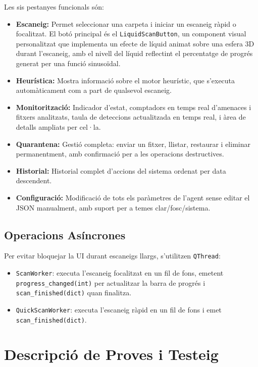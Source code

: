\documentclass[12pt,a4paper]{report}
\begin{document}
Les sis pestanyes funcionals són:
\begin{itemize}
    \item \textbf{Escaneig:} Permet seleccionar una carpeta i iniciar un escaneig ràpid o focalitzat. El botó principal és el \texttt{LiquidScanButton}, un component visual personalitzat que implementa un efecte de líquid animat sobre una esfera 3D durant l'escaneig, amb el nivell del líquid reflectint el percentatge de progrés generat per una funció sinusoïdal.
    \item \textbf{Heurística:} Mostra informació sobre el motor heurístic, que s'executa automàticament com a part de qualsevol escaneig.
    \item \textbf{Monitorització:} Indicador d'estat, comptadors en temps real d'amenaces i fitxers analitzats, taula de deteccions actualitzada en temps real, i àrea de detalls ampliats per cel·la.
    \item \textbf{Quarantena:} Gestió completa: enviar un fitxer, llistar, restaurar i eliminar permanentment, amb confirmació per a les operacions destructives.
    \item \textbf{Historial:} Historial complet d'accions del sistema ordenat per data descendent.
    \item \textbf{Configuració:} Modificació de tots els paràmetres de l'agent sense editar el JSON manualment, amb suport per a temes clar/fosc/sistema.
\end{itemize}

\subsection{Operacions Asíncrones}
Per evitar bloquejar la UI durant escaneigs llargs, s'utilitzen \texttt{QThread}:
\begin{itemize}
    \item \texttt{ScanWorker}: executa l'escaneig focalitzat en un fil de fons, emetent \texttt{progress\_changed(int)} per actualitzar la barra de progrés i \texttt{scan\_finished(dict)} quan finalitza.
    \item \texttt{QuickScanWorker}: executa l'escaneig ràpid en un fil de fons i emet \texttt{scan\_finished(dict)}.
\end{itemize}

\section{Descripció de Proves i Testeig}
\end{document}
